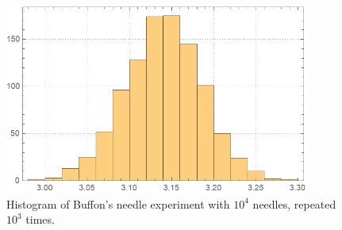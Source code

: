 \documentclass[12pt]{article}
\numberwithin{equation}{section}
\begin{document}
\begin{figure}[!htb]
    \centering
    \includegraphics[width=10cm]{Images/repeatedneedle.png}
    \caption{Histogram of Buffon's needle experiment with $10^4$ needles, repeated $10^3$ times.}
    \label{fig:repeatedneedle}
\end{figure}

\clearpage
\end{document}
